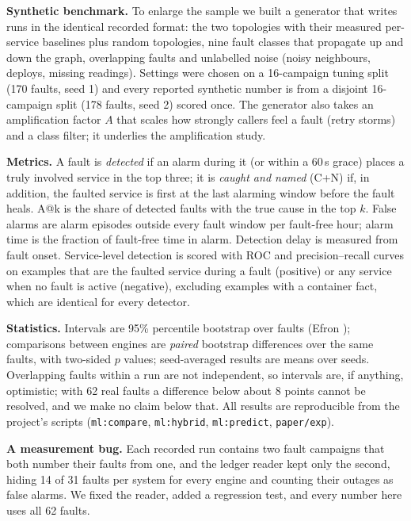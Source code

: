 \documentclass[journal]{IEEEtran}
\makeatletter
\newcommand{\acc}[1]{\textrm{A@}#1}
\newcommand{\cn}{\textrm{C+N}}
\makeatother
\begin{document}
\textbf{Synthetic benchmark.} To enlarge the sample we built a generator that writes runs in the identical recorded format: the two
topologies with their measured per-service baselines plus random topologies, nine fault classes that propagate up and down the graph,
overlapping faults and unlabelled noise (noisy neighbours, deploys, missing readings). Settings were chosen on a 16-campaign tuning split
(170 faults, seed 1) and every reported synthetic number is from a disjoint 16-campaign split (178 faults, seed 2) scored once. The
generator also takes an amplification factor $A$ that scales how strongly callers feel a fault (retry storms) and a class filter; it
underlies the amplification study.

\textbf{Metrics.} A fault is \emph{detected} if an alarm during it (or within a 60\,s grace) places a truly involved service in the top three;
it is \emph{caught and named} (\cn) if, in addition, the faulted service is first at the last alarming window before the fault heals.
\acc{k} is the share of detected faults with the true cause in the top $k$. False alarms are alarm episodes outside every fault window per
fault-free hour; alarm time is the fraction of fault-free time in alarm. Detection delay is measured from fault onset. Service-level
detection is scored with ROC and precision--recall curves on examples that are the faulted service during a fault (positive) or any service
when no fault is active (negative), excluding examples with a container fact, which are identical for every detector.

\textbf{Statistics.} Intervals are 95\% percentile bootstrap over faults (Efron \cite{efron1979bootstrap}); comparisons between engines are
\emph{paired} bootstrap differences over the same faults, with two-sided $p$ values; seed-averaged results are means over seeds. Overlapping
faults within a run are not independent, so intervals are, if anything, optimistic; with 62 real faults a difference below about
8 points cannot be resolved, and we make no claim below that. All results are reproducible from the project's scripts
(\texttt{ml:compare}, \texttt{ml:hybrid}, \texttt{ml:predict}, \texttt{paper/exp}).

\textbf{A measurement bug.} Each recorded run contains two fault campaigns that both number their faults from one, and the ledger reader kept
only the second, hiding 14 of 31 faults per system for every engine and counting their outages as false alarms. We fixed the reader, added
a regression test, and every number here uses all 62 faults.
\end{document}
